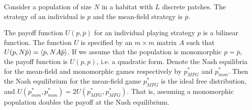 \begin{proposition}
  \label{prop:doubleup}
  Consider a population of size $N$ in a habitat with $L$ discrete patches. The strategy of an individual is $p$ and the mean-field strategy is $\overbar{p}$.

  The payoff function $U(p,\overbar{p})$ for an individual playing strategy $p$ is a bilinear function. The function $U$ is specified by an $m\times m$ matrix $A$ such that $U(p,N\overbar{p}) = \ip{p}{N A \overbar{p}}$. If we assume that the population is monomorphic $p = \overbar{p}$, the payoff function is $U(p,p)$, i.e. a quadratic form. Denote the Nash equilibria for the mean-field and monomorphic games respectively by $p^*_{MFG}$ and $p^*_{mon}$. Then the Nash equilibrium for the mean-field game $p^*_{MFG}$ is the ideal free distribution, and $U(p^*_{mon}, p^*_{mon}) = 2U(p^*_{MFG},p^*_{MFG})$. That is, assuming a monomorphic population doubles the payoff at the Nash equilibrium.%
\end{proposition}
